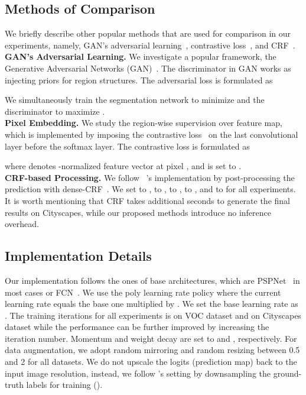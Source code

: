 \subsection{Methods of Comparison}
\label{subsec:baseline_methods}
We briefly describe other popular methods that are used for comparison in our experiments, namely, GAN's adversarial learning~\cite{goodfellow2014generative}, contrastive loss~\cite{chopra2005learning}, and CRF~\cite{krahenbuhl2011efficient}. \\

\noindent
\textbf{GAN's Adversarial Learning.} 
We investigate a popular framework, the Generative Adversarial Networks (GAN)~\cite{goodfellow2014generative}. The discriminator  in GAN works as injecting priors for region structures. The adversarial loss is formulated as

We simultaneously train the segmentation network  to minimize  and the discriminator to maximize . \\

\noindent
\textbf{Pixel Embedding.} 
We study the region-wise supervision over feature map, which is implemented by imposing the contrastive loss~\cite{chopra2005learning} on the last convolutional layer before the softmax layer. The contrastive loss is formulated as


where  denotes -normalized feature vector at pixel , and  is set to . \\

\noindent 
\textbf{CRF-based Processing.} 
We follow ~\cite{chen2016deeplab}'s implementation by post-processing the prediction with dense-CRF~\cite{krahenbuhl2011efficient}. We set  to ,  to ,  to ,  to , and  to  for all experiments. It is worth mentioning that CRF takes additional  seconds to generate the final results on Cityscapes, while our proposed methods introduce no inference overhead.

\subsection{Implementation Details}
\label{subsec:imp_details}

Our implementation follows the ones of base architectures, which are PSPNet~\cite{zhao2016pyramid} in most cases or FCN~\cite{long2015fully}. We use the poly learning rate policy where the current learning rate equals the base one multiplied by  . We set the base learning rate as . The training iterations for all experiments is  on VOC dataset and  on Cityscapes dataset while the performance can be further improved by increasing the iteration number. Momentum and weight decay are set to  and , respectively.  For data augmentation, we adopt random mirroring and random resizing between 0.5 and 2 for all
datasets. We do not upscale the logits (prediction map) back to the input image resolution, instead, we follow \cite{chen2016deeplab}'s setting by downsampling the ground-truth labels for training ().

